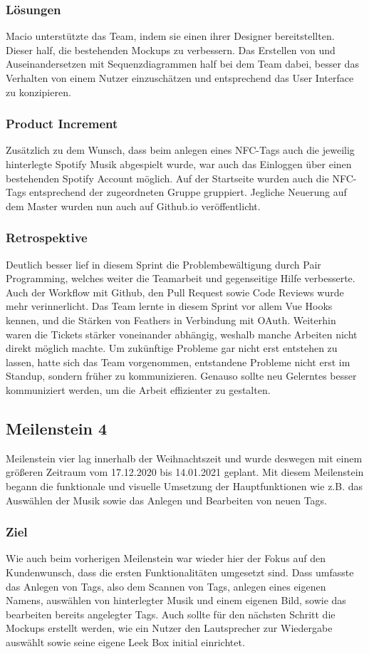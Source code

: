 \documentclass[10pt, a4paper, draft]{article}
\begin{document}
\subsubsection{Lösungen}
Macio unterstützte das Team, indem sie einen ihrer Designer bereitstellten.
Dieser half, die bestehenden Mockups zu verbessern.
Das Erstellen von und Auseinandersetzen mit Sequenzdiagrammen half bei dem Team dabei, besser das Verhalten von einem Nutzer einzuschätzen und entsprechend das User Interface zu konzipieren.
\subsubsection{Product Increment}
Zusätzlich zu dem Wunsch, dass beim anlegen eines NFC-Tags auch die jeweilig hinterlegte Spotify Musik abgespielt wurde, war auch das Einloggen über einen bestehenden Spotify Account möglich.
Auf der Startseite wurden auch die NFC-Tags entsprechend der zugeordneten Gruppe gruppiert.
Jegliche Neuerung auf dem Master wurden nun auch auf Github.io veröffentlicht.

\subsubsection{Retrospektive}
Deutlich besser lief in diesem Sprint die Problembewältigung durch Pair Programming, welches weiter die Teamarbeit und gegenseitige Hilfe verbesserte.
Auch der Workflow mit Github, den Pull Request sowie Code Reviews wurde mehr verinnerlicht.
Das Team lernte in diesem Sprint vor allem Vue Hooks kennen, und die Stärken von Feathers in Verbindung mit OAuth.
Weiterhin waren die Tickets stärker voneinander abhängig, weshalb manche Arbeiten nicht direkt möglich machte.
Um zukünftige Probleme gar nicht erst entstehen zu lassen, hatte sich das Team vorgenommen, entstandene Probleme nicht erst im Standup, sondern früher zu kommunizieren.
Genauso sollte neu Gelerntes besser kommuniziert werden, um die Arbeit effizienter zu gestalten.

\subsection{Meilenstein 4}
Meilenstein vier lag innerhalb der Weihnachtszeit und wurde deswegen mit einem größeren Zeitraum vom 17.12.2020 bis 14.01.2021 geplant.
Mit diesem Meilenstein begann die funktionale und visuelle Umsetzung der Hauptfunktionen wie z.B. das Auswählen der Musik sowie das Anlegen und Bearbeiten von neuen Tags.
\subsubsection{Ziel}
Wie auch beim vorherigen Meilenstein war wieder hier der Fokus auf den Kundenwunsch, dass die ersten Funktionalitäten umgesetzt sind.
Dass umfasste das Anlegen von Tags, also dem Scannen von Tags, anlegen eines eigenen Namens, auswählen von hinterlegter Musik und einem eigenen Bild, sowie das bearbeiten bereits angelegter Tags.
Auch sollte für den nächsten Schritt die Mockups erstellt werden, wie ein Nutzer den Lautsprecher zur Wiedergabe auswählt sowie seine eigene Leek Box initial einrichtet.
\end{document}
